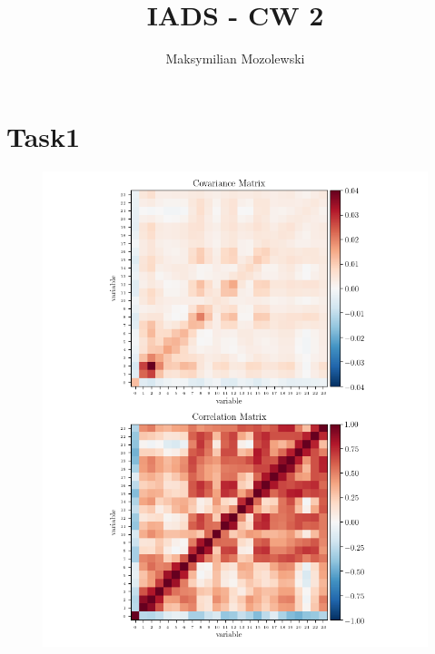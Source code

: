 \documentclass{report}
\begin{document}
\title{IADS - CW 2}
\author{Maksymilian Mozolewski}
\maketitle
\pagebreak
\section{Task1}
\begin{figure}[h]
    \caption{}
    \centering
    \includegraphics[scale=1]{Years/Year2/Semester2/Learning/CW/python_code/correlation.png}
\end{figure}
\end{document}
